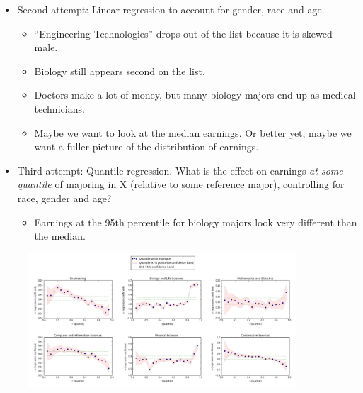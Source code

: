 \documentclass{beamer}
\begin{document}
\begin{frame}
	\begin{itemize}
		\item Second attempt: Linear regression to account for gender, race and age.
			\begin{itemize}
				\item “Engineering Technologies” drops out of the list because it is skewed male.
				\item Biology still appears second on the list.
				\item Doctors make a lot of money, but many biology majors end up as medical technicians.
				\item Maybe we want to look at the median earnings. Or better yet, maybe we want a fuller picture of the distribution of earnings.
			\end{itemize}
	\end{itemize}
\end{frame}

\begin{frame}
	\begin{itemize}
		\item Third attempt: Quantile regression. What is the effect on earnings \textit{at some quantile} of majoring in X (relative to some reference major), controlling for race, gender and age? 
		\begin{itemize}
			\item Earnings at the 95th percentile for biology majors look very different than the median.
		\end{itemize}
	\end{itemize}
	\begin{figure}
		\includegraphics[width=10cm]{chinoy-majors-2.png}
		\centering
	\end{figure}
\end{frame}
\end{document}
